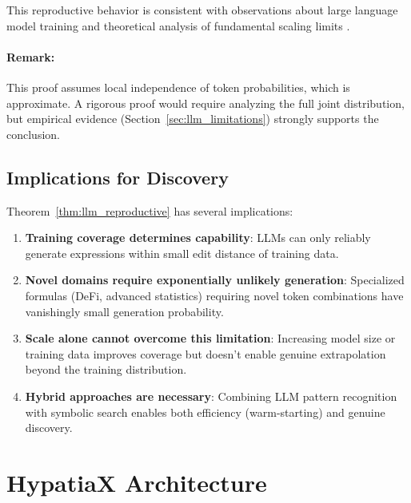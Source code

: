 \documentclass[twoside,11pt]{article}
\begin{document}
This reproductive behavior is consistent with observations about large language model training \citep{hoffmann2022training} and theoretical analysis of fundamental scaling limits \citep{xu2025fundamental}.

\paragraph{Remark:} This proof assumes local independence of token probabilities, which is approximate. A rigorous proof would require analyzing the full joint distribution, but empirical evidence (Section~\ref{sec:llm_limitations}) strongly supports the conclusion\citep{kambhampati2024llms}.

\subsection{Implications for Discovery}\citep{koza1994genetic}

Theorem~\ref{thm:llm_reproductive} has several implications:\citep{kambhampati2024llms}

\begin{enumerate}
\item \textbf{Training coverage determines capability}: LLMs can only reliably generate expressions within small edit distance of training data\citep{kambhampati2024llms}.

\item \textbf{Novel domains require exponentially unlikely generation}: Specialized formulas (DeFi, advanced statistics) requiring novel token combinations have vanishingly small generation probability.

\item \textbf{Scale alone cannot overcome this limitation}: Increasing model size or training data improves coverage but doesn't enable genuine extrapolation beyond the training distribution.

\item \textbf{Hybrid approaches are necessary}: Combining LLM pattern recognition with symbolic search enables both efficiency (warm-starting) and genuine discovery\citep{koza1994genetic}\citep{kambhampati2024llms}.
\end{enumerate}

\section{HypatiaX Architecture}
\label{sec:architecture}
\end{document}
